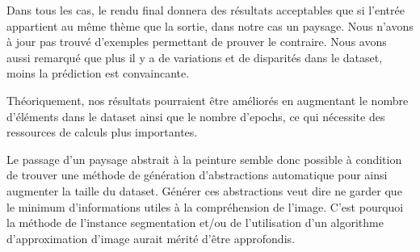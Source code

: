 \documentclass[a4paper, 12pt]{report}
\begin{document}
Dans tous les cas, le rendu final donnera des résultats acceptables que si l'entrée appartient au même thème que la sortie, dans notre cas un paysage. Nous n'avons à jour pas trouvé d'exemples permettant de prouver le contraire. Nous avons aussi remarqué que plus il y a de variations et de disparités dans le dataset, moins la prédiction est convaincante.

Théoriquement, nos résultats pourraient être améliorés en augmentant le nombre d'éléments dans le dataset ainsi que le nombre d'epochs, ce qui nécessite des ressources de calculs plus importantes.

Le passage d'un paysage abstrait à la peinture semble donc possible à condition de trouver une méthode de génération d'abstractions automatique pour ainsi augmenter la taille du dataset. Générer ces abstractions veut dire ne garder que le minimum d'informations utiles à la compréhension de l'image. C'est pourquoi la méthode de l'instance segmentation et/ou de l’utilisation d'un algorithme d'approximation d'image aurait mérité d'être approfondis.



\end{document}
